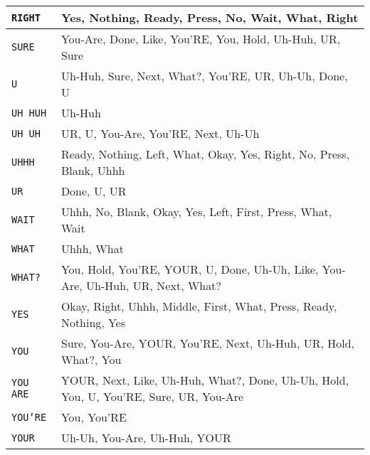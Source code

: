 \documentclass[11pt]{article}
\begin{document}
\begin{multicols}{3}
\begin{tabular}{|l|p{3.75in}|}
                   \hline
\texttt{RIGHT}   & Yes, Nothing, Ready, Press, No, Wait, What, Right \\ \hline
\texttt{SURE}    & You-Are, Done, Like, You'RE, You, Hold, Uh-Huh, UR, Sure \\
                   \hline
\texttt{U}       & Uh-Huh, Sure, Next, What?, You'RE, UR, Uh-Uh, Done, U \\
                   \hline
\texttt{UH HUH}  & Uh-Huh \\ \hline
\texttt{UH UH}   & UR, U, You-Are, You'RE, Next, Uh-Uh \\ \hline
\texttt{UHHH}    & Ready, Nothing, Left, What, Okay, Yes, Right, No, Press,
                   Blank, Uhhh \\ \hline
\texttt{UR}      & Done, U, UR \\ \hline
\texttt{WAIT}    & Uhhh, No, Blank, Okay, Yes, Left, First, Press, What, Wait
                   \\ \hline
\texttt{WHAT}    & Uhhh, What \\ \hline
\texttt{WHAT?}   & You, Hold, You'RE, YOUR, U, Done, Uh-Uh, Like, You-Are,
                   Uh-Huh, UR, Next, What? \\ \hline
\texttt{YES}     & Okay, Right, Uhhh, Middle, First, What, Press, Ready,
                   Nothing, Yes \\ \hline
\texttt{YOU}     & Sure, You-Are, YOUR, You'RE, Next, Uh-Huh, UR, Hold, What?,
                   You \\ \hline
\texttt{YOU ARE} & YOUR, Next, Like, Uh-Huh, What?, Done, Uh-Uh, Hold, You, U,
                   You'RE, Sure, UR, You-Are \\ \hline
\texttt{YOU'RE}  & You, You'RE \\ \hline
\texttt{YOUR}    & Uh-Uh, You-Are, Uh-Huh, YOUR \\ \hline
\end{tabular}

\end{multicols}

\newpage
\end{document}
